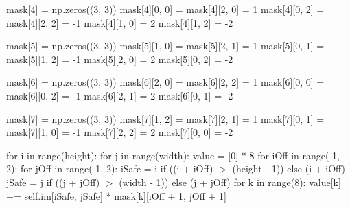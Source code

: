 \documentclass[final,a4paper,openany,12pt]{mwbk}
\begin{document}
\indent \indent \indent mask[4] = np.zeros((3, 3)) \newline
\indent \indent \indent mask[4][0, 0] = mask[4][2, 0] = 1 \newline
\indent \indent \indent mask[4][0, 2] = mask[4][2, 2] = -1 \newline
\indent \indent \indent mask[4][1, 0] = 2 \newline
\indent \indent \indent mask[4][1, 2] = -2 \newline

\indent \indent \indent mask[5] = np.zeros((3, 3)) \newline
\indent \indent \indent mask[5][1, 0] = mask[5][2, 1] = 1 \newline
\indent \indent \indent mask[5][0, 1] = mask[5][1, 2] = -1 \newline
\indent \indent \indent mask[5][2, 0] = 2 \newline
\indent \indent \indent mask[5][0, 2] = -2 \newline

\indent \indent \indent mask[6] = np.zeros((3, 3)) \newline
\indent \indent \indent mask[6][2, 0] = mask[6][2, 2] = 1 \newline
\indent \indent \indent mask[6][0, 0] = mask[6][0, 2] = -1 \newline
\indent \indent \indent mask[6][2, 1] = 2 \newline
\indent \indent \indent mask[6][0, 1] = -2 \newline

\indent \indent \indent mask[7] = np.zeros((3, 3)) \newline
\indent \indent \indent mask[7][1, 2] = mask[7][2, 1] = 1 \newline
\indent \indent \indent mask[7][0, 1] = mask[7][1, 0] = -1 \newline
\indent \indent \indent mask[7][2, 2] = 2 \newline
\indent \indent \indent mask[7][0, 0] = -2 \newline

\indent \indent \indent for i in range(height): \newline
\indent \indent \indent for j in range(width): \newline
\indent \indent \indent value = [0] * 8 \newline
\indent \indent \indent for iOff in range(-1, 2): \newline
\indent \indent \indent for jOff in range(-1, 2): \newline
\indent \indent \indent iSafe = i if ((i + iOff) $>$ (height - 1)) else (i + iOff) \newline
\indent \indent \indent jSafe = j if ((j + jOff) $>$ (width - 1)) else (j + jOff) \newline
\indent \indent \indent for k in range(8): \newline
\indent \indent \indent value[k] += self.im[iSafe, jSafe] * mask[k][iOff + 1, jOff + 1] \newline
\end{document}
